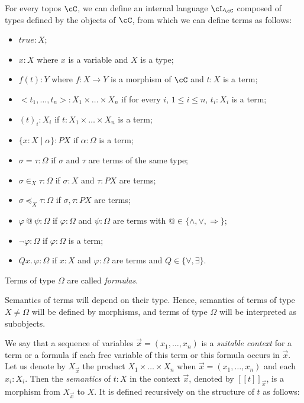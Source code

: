 \documentclass[preprint,3p,times]{elsarticle}
\def\sem#1{[\![ #1 ] \!]}
\begin{document}
For every topos $\cC$, we can define an internal language $\cL_\cC$ composed of types defined by the objects of $\cC$, from which we can define terms as follows:

\begin{itemize}
\item $true:X$;
\item $x:X$ where $x$ is a variable and $X$ is a type;
\item $f(t):Y$ where $f : X \to Y$ is a morphism of $\cC$ and $t:X$ is a term;
\item $<t_1,\ldots,t_n>: X_1 \times \ldots \times X_n$ if for every $i$, $1 \leq i \leq n$, $t_i:X_i$ is a term;
\item $(t)_i:X_i$ if $t:X_1 \times \ldots \times X_n$ is a term;
\item $\{x:X \mid \alpha\}:PX$ if $\alpha:\Omega$ is a term;
\item $\sigma = \tau:\Omega$ if $\sigma$ and $\tau$ are terms of the same type;
\item $\sigma \in_X \tau:\Omega$ if $\sigma:X$ and $\tau:PX$ are terms;
\item $\sigma \preceq_X \tau:\Omega$ if $\sigma,\tau:PX$ are terms;
\item $\varphi~@~\psi:\Omega$ if $\varphi:\Omega$ and $\psi:\Omega$ are terms with $@ \in \{\wedge,\vee,\Rightarrow\}$;
\item $\neg \varphi:\Omega$ if $\varphi:\Omega$ is a term;
\item $Q x.\,\varphi:\Omega$ if $x:X$ and $\varphi:\Omega$ are terms and $Q \in \{\forall,\exists\}$.
\end{itemize}
Terms of type $\Omega$ are called {\em formulas}.

Semantics of terms will depend on their type. Hence, semantics of terms of type $X \neq \Omega$ will be defined by morphisms, and terms of type $\Omega$ will be interpreted as subobjects. 

We say that a sequence of variables $\vec{x} = (x_1,\ldots,x_n)$ is a {\em suitable context} for a term or a formula if each free variable of this term or this formula occurs in $\vec{x}$. Let us denote by $X_{\vec{x}}$ the product $X_1 \times \ldots \times X_n$ when $\vec{x} = (x_1,\ldots,x_n)$ and each $x_i : X_i$. Then the {\em semantics} of $t:X$ in the context $\vec{x}$, denoted by $\sem{t}_{\vec{x}}$, is a morphism from $X_{\vec{x}}$ to $X$.  It is defined recursively on the structure of $t$ as follows:
\end{document}
